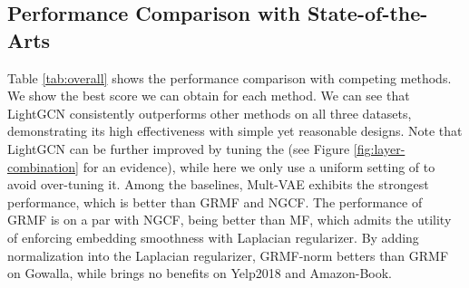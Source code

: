 \documentclass[sigconf]{acmart}
\theoremstyle{definition}
\begin{document}
\subsection{Performance Comparison with State-of-the-Arts}\label{ss:exp-SOTA}
Table \ref{tab:overall} shows the performance comparison with competing methods. We show the best score we can obtain for each method. We can see that LightGCN consistently outperforms other methods on all three datasets, demonstrating its high effectiveness with simple yet reasonable designs. Note that LightGCN can be further improved by tuning the  (see Figure \ref{fig:layer-combination} for an evidence), while here we only use a uniform setting of  to avoid over-tuning it. Among the baselines, Mult-VAE exhibits the strongest performance, which is better than GRMF and NGCF. 
The performance of GRMF is on a par with NGCF, being better than MF, which admits the utility of enforcing embedding smoothness with Laplacian regularizer. 
By adding normalization into the Laplacian regularizer, GRMF-norm betters than GRMF on Gowalla, while brings no benefits on Yelp2018 and Amazon-Book. 



\begin{table}[h]
\caption{The comparison of overall performance among LightGCN and competing methods.}\vspace{-8pt}
\label{tab:overall}
\end{table}
\end{document}
